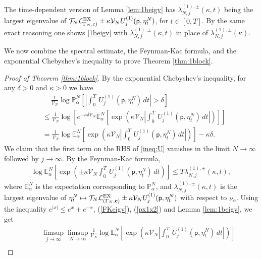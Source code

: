 \documentclass[11pt]{amsart}
\theoremstyle{plain}
\theoremstyle{definition}
\theoremstyle{remark}
\begin{document}
The time-dependent version of Lemma \ref{lem:1beigv} has $\lambda^{(1),\pm}_{N,j}(\kappa, t)$ being the largest eigenvalue of $\mathcal{T}_N \mathcal{L}^{\rm EX}_{\Gamma_N, c)}\pm \kappa \mathcal{V}_N U_j^{(1)}({\mathsf{p}}, \eta_t^N)$, for $t\in [0,T]$. By the same exact reasoning one shows \eqref{1beigv} with $\lambda^{(1),\pm}_{N,j}(\kappa, t)$ in place of $\lambda^{(1),\pm}_{N,j}(\kappa)$.

We now combine the spectral estimate, the Feynman-Kac formula, and the exponential Chebyshev's inequality to prove Theorem \ref{thm:1block}.

\begin{proof}[Proof of Theorem \ref{thm:1block}]
By the exponential Chebyshev's inequality, for any $\delta>0$ and $\kappa>0$ we have
\begin{align}
\label{ineq:U}
&~\quad\frac{1}{\mathcal{V}_N} \log \mathbb{P}^N_{\alpha}\left[\left|\int_0^T\, {U^{(1)}_{{{j}}}}({\mathsf{p}},\eta^N_t)\,dt\right| >\delta \right] \\ 
\nonumber &\leq \frac{1}{\mathcal{V}_N} \log \left[e^{-\kappa\delta \mathcal{V}_N} \mathbb{E}^N_{\alpha}\left[\exp\left(\kappa \mathcal{V}_N\left|\int_0^T  \, {U^{(1)}_{{{j}}}}({\mathsf{p}},\eta^N_t)\,dt\right| \right)\right]\right]\\
\nonumber &= \frac{1}{\mathcal{V}_N} \log \mathbb{E}^N_{\alpha} \left[\exp\left(\kappa \mathcal{V}_N \left|\int_0^T \, {U^{(1)}_{{{j}}}}({\mathsf{p}},\eta_t^N)\,dt\right|\right)\right] - \kappa\delta.
\end{align}
We claim that the first term on the RHS of \eqref{ineq:U} vanishes in the limit $N\to\infty$ followed by $j\to\infty$. By the Feynman-Kac formula, 
\begin{align}
\label{FKeigv}
\log \mathbb{E}^N_{\alpha}\left[\exp\left(\pm \kappa \mathcal{V}_N \int_0^T\, {U^{(1)}_{{{j}}}}({\mathsf{p}},\eta_t^N)\,dt\right)\right] \leq T \lambda^{(1),\pm}_{N,j}(\kappa,t),
\end{align}
where $\mathbb{E}^N_\alpha$ is the expectation corresponding to $\mathbb{P}^N_\alpha$, and $\lambda^{(1),\pm}_{N,j}(\kappa,t)$ is the largest eigenvalue of $\eta_t^N \mapsto \mathcal{T}_N \mathcal{L}^{\rm EX}_{(\Gamma_N,{\bf c})} \pm \kappa \mathcal{V}_N {U^{(1)}_{{{j}}}}({\mathsf{p}},\eta_t^N)$ with respect to $\nu_\alpha$. Using the inequality $e^{|x|} \leq e^x + e^{-x}$, (\ref{FKeigv}), (\ref{px1x2}) and Lemma \ref{lem:1beigv}, we get
\begin{align*}
& ~\quad\limsup_{j\to\infty} \limsup_{N\to\infty} \frac{1}{\mathcal{V}_N}  \log \mathbb{E}^N_{\alpha} \left[\exp\left(\kappa \mathcal{V}_N \left|\int_0^T \, {U^{(1)}_{{{j}}}}({\mathsf{p}},\eta_t^N)\,dt\right|\right)\right]\\

\end{align*}
\end{proof}
\end{document}
